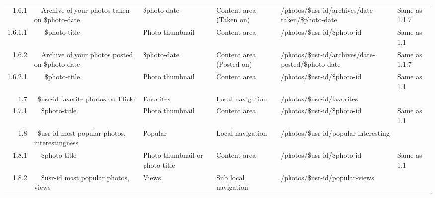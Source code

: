 \documentclass[12pt,a4paper]{article}
\begin{document}
\begin{landscape}
\begin{table}[h!b!p!]
\begin{center}
\begin{tiny}
\begin{tabular}{r|l|l|l|l|p{3cm}}
                1.6.1 &
                ~~Archive of your photos taken on \$photo-date &
                \$photo-date &
                Content area (Taken on) &
                /photos/\$usr-id/archives/date-taken/\$photo-date &
                Same as 1.1.7 \\

                  1.6.1.1 &
                  ~~~\$photo-title &
                  Photo thumbnail &
                  Content area &
                  /photos/\$usr-id/\$photo-id &
                  Same as 1.1 \\

                1.6.2 &
                ~~Archive of your photos posted on \$photo-date &
                \$photo-date &
                Content area (Posted on) &
                /photos/\$usr-id/archives/date-posted/\$photo-date &
                Same as 1.1.7 \\

                  1.6.2.1 &
                  ~~~\$photo-title &
                  Photo thumbnail &
                  Content area &
                  /photos/\$usr-id/\$photo-id &
                  Same as 1.1 \\

              1.7 &
              ~\$usr-id favorite photos on Flickr &
              Favorites &
              Local navigation &
              /photos/\$usr-id/favorites &
              \\

                1.7.1 &
                ~~\$photo-title &
                Photo thumbnail &
                Content area &
                /photos/\$usr-id/\$photo-id &
                Same as 1.1 \\

              1.8 &
              ~\$usr-id most popular photos, interestingness &
              Popular &
              Local navigation &
              /photos/\$usr-id/popular-interesting &
              \\

                1.8.1 &
                ~~\$photo-title &
                Photo thumbnail or photo title &
                Content area &
                /photos/\$usr-id/\$photo-id &
                Same as 1.1 \\

                1.8.2 &
                ~~\$usr-id most popular photos, views &
                Views &
                Sub local navigation &
                /photos/\$usr-id/popular-views &
                \\


\end{tabular}
\end{tiny}
\end{center}
\end{table}
\end{landscape}
\end{document}
